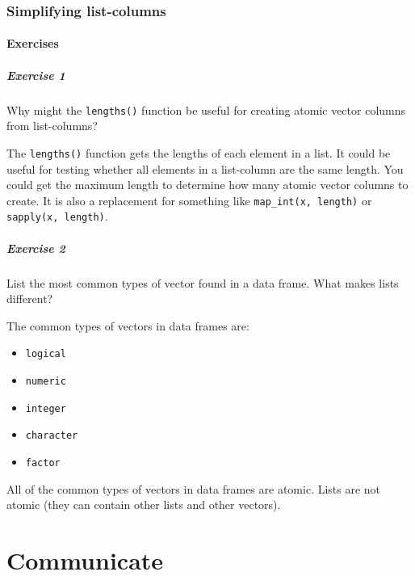 \documentclass[]{book}
\providecommand{\tightlist}{%
  \setlength{\itemsep}{0pt}\setlength{\parskip}{0pt}}
\theoremstyle{plain}
\theoremstyle{remark}
\theoremstyle{definition}
\theoremstyle{definition}
\theoremstyle{definition}
\theoremstyle{remark}
\begin{document}
\hypertarget{simplifying-list-columns}{%
\section{Simplifying list-columns}\label{simplifying-list-columns}}

\hypertarget{exercises-5}{%
\subsection{Exercises}\label{exercises-5}}

\hypertarget{exercise-1-69}{%
\subsubsection{Exercise 1}\label{exercise-1-69}}

Why might the \texttt{lengths()} function be useful for creating atomic
vector columns from list-columns?

The \texttt{lengths()} function gets the lengths of each element in a
list. It could be useful for testing whether all elements in a
list-column are the same length. You could get the maximum length to
determine how many atomic vector columns to create. It is also a
replacement for something like \texttt{map\_int(x,\ length)} or
\texttt{sapply(x,\ length)}.

\hypertarget{exercise-2-67}{%
\subsubsection{Exercise 2}\label{exercise-2-67}}

List the most common types of vector found in a data frame. What makes
lists different?

The common types of vectors in data frames are:

\begin{itemize}
\tightlist
\item
  \texttt{logical}
\item
  \texttt{numeric}
\item
  \texttt{integer}
\item
  \texttt{character}
\item
  \texttt{factor}
\end{itemize}

All of the common types of vectors in data frames are atomic. Lists are
not atomic (they can contain other lists and other vectors).

\hypertarget{part-communicate}{%
\part{Communicate}\label{part-communicate}}
\end{document}
